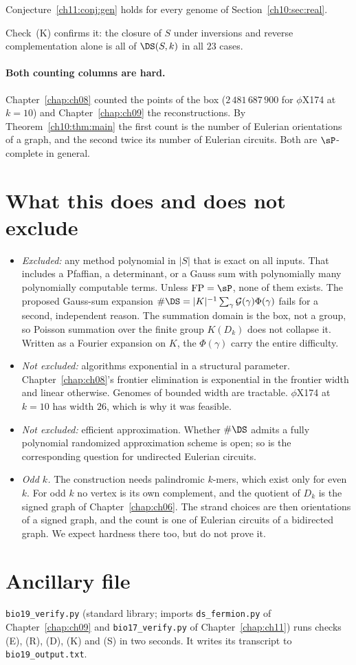 \begin{corollary}
Conjecture~\ref{ch11:conj:gen} holds for every genome of Section~\ref{ch10:sec:real}.
\end{corollary}

Check~(K) confirms it: the closure of $S$ under inversions and reverse complementation alone is all of
$\DS(S,k)$ in all $23$ cases.

\paragraph{Both counting columns are hard.} Chapter~\ref{chap:ch08} counted the points of the box ($2\,481\,687\,900$ for
$\phi$X174 at $k=10$) and Chapter~\ref{chap:ch09} the reconstructions. By Theorem~\ref{ch10:thm:main} the first count is the
number of Eulerian orientations of a graph, and the second twice its number of Eulerian circuits. Both are
$\sP$-complete in general.

\section{What this does and does not exclude}\label{ch10:sec:scope}

\begin{itemize}
\item \emph{Excluded:} any method polynomial in $|S|$ that is exact on all inputs. That includes a
Pfaffian, a determinant, or a Gauss sum with polynomially many polynomially computable terms. Unless
$\mathrm{FP}=\sP$, none of them exists. The proposed Gauss-sum expansion
$\#\DS=|K|^{-1}\sum_\gamma\mathcal G(\gamma)\Phi(\gamma)$ fails for a second, independent reason. The
summation domain is the box, not a group, so Poisson summation over the finite group $K(D_k)$ does not
collapse it. Written as a Fourier expansion on $K$, the $\Phi(\gamma)$ carry the entire difficulty.
\item \emph{Not excluded:} algorithms exponential in a structural parameter. Chapter~\ref{chap:ch08}'s frontier
elimination is exponential in the frontier width and linear otherwise. Genomes of bounded width are
tractable. $\phi$X174 at $k=10$ has width $26$, which is why it was feasible.
\item \emph{Not excluded:} efficient approximation. Whether $\#\DS$ admits a fully polynomial randomized
approximation scheme is open; so is the corresponding question for undirected Eulerian circuits.
\item \emph{Odd $k$.} The construction needs palindromic $k$-mers, which exist only for even $k$. For odd
$k$ no vertex is its own complement, and the quotient of $D_k$ is the signed graph of Chapter~\ref{chap:ch06}.
The strand choices are then orientations of a signed graph, and the count is one of Eulerian circuits of a
bidirected graph. We expect hardness there too, but do not prove it.
\end{itemize}

\section*{Ancillary file}
\texttt{bio19\_verify.py} (standard library; imports \texttt{ds\_fermion.py} of Chapter~\ref{chap:ch09} and
\texttt{bio17\_verify.py} of Chapter~\ref{chap:ch11}) runs checks (E), (R), (D), (K) and (S) in two seconds. It writes
its transcript to \texttt{bio19\_output.txt}.
